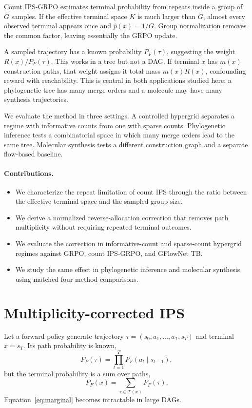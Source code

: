 \documentclass[11pt]{article}
\begin{document}
Count IPS-GRPO estimates terminal probability from repeats inside a group of
\(G\) samples. If the effective terminal space \(K\) is much larger than
\(G\), almost every observed terminal appears once and \(\hat p(x)=1/G\).
Group normalization removes the common factor, leaving essentially the GRPO
update.

A sampled trajectory has a known probability \(P_F(\tau)\), suggesting the
weight \(R(x)/P_F(\tau)\). This works in a tree but not a DAG. If terminal
\(x\) has \(m(x)\) construction paths, that weight assigns it total mass
\(m(x)R(x)\), confounding reward with reachability. This is central in both
applications studied here: a phylogenetic tree has many merge orders and a
molecule may have many synthesis trajectories.

We evaluate the method in three settings. A controlled hypergrid separates a
regime with informative counts from one with sparse counts. Phylogenetic
inference tests a combinatorial space in which many merge orders lead to the
same tree. Molecular synthesis tests a different construction graph and a
separate flow-based baseline.

\paragraph{Contributions.}
\begin{itemize}
 \item We characterize the repeat limitation of count IPS through the ratio
 between the effective terminal space and the sampled group size.
 \item We derive a normalized reverse-allocation correction that removes path
 multiplicity without requiring repeated terminal outcomes.
 \item We evaluate the correction in informative-count and sparse-count
 hypergrid regimes against GRPO, count IPS-GRPO, and GFlowNet TB.
 \item We study the same effect in phylogenetic inference and molecular
 synthesis using matched four-method comparisons.
\end{itemize}

\section{Multiplicity-corrected IPS}

Let a forward policy generate trajectory
\(\tau=(s_0,a_1,\ldots,a_T,s_T)\) and terminal \(x=s_T\). Its path
probability is known,
\begin{equation}
 P_F(\tau)=\prod_{t=1}^{T}P_F(a_t\mid s_{t-1}),
\end{equation}
but the terminal probability is a sum over paths,
\begin{equation}
 P_F(x)=\sum_{\tau\in\mathcal T(x)}P_F(\tau).
 \label{eq:marginal}
\end{equation}
Equation~\eqref{eq:marginal} becomes intractable in large DAGs.
\end{document}
